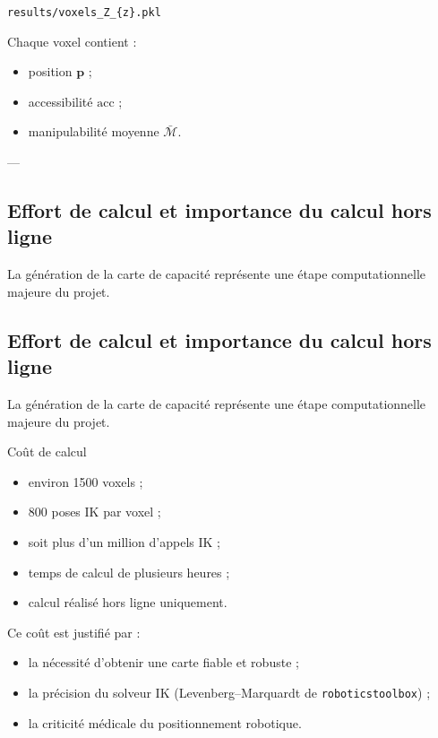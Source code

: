 \documentclass[11pt, a4paper]{article}
\begin{document}
\begin{center}
\texttt{results/voxels\_Z\_\{z\}.pkl}
\end{center}

Chaque voxel contient :
\begin{itemize}
  \item position $\mathbf{p}$ ;
  \item accessibilité $\mathrm{acc}$ ;
  \item manipulabilité moyenne $\bar{\mathcal{M}}$.
\end{itemize}

---

\subsection{Effort de calcul et importance du calcul hors ligne}

La génération de la carte de capacité représente une étape computationnelle majeure du projet.

\subsection{Effort de calcul et importance du calcul hors ligne}

La génération de la carte de capacité représente une étape computationnelle majeure du projet.

\begin{resultbox}{Coût de calcul}
\begin{itemize}
  \item environ 1500 voxels ;
  \item 800 poses IK par voxel ;
  \item soit plus d’un million d’appels IK ;
  \item temps de calcul de plusieurs heures ;
  \item calcul réalisé hors ligne uniquement.
\end{itemize}
\end{resultbox}

Ce coût est justifié par :
\begin{itemize}
  \item la nécessité d’obtenir une carte fiable et robuste ;
  \item la précision du solveur IK (Levenberg–Marquardt de \texttt{roboticstoolbox}) ;
  \item la criticité médicale du positionnement robotique.
\end{itemize}
\end{document}
